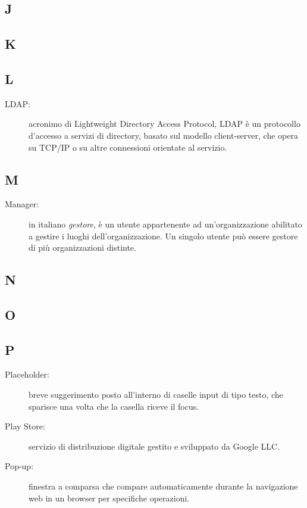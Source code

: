 \documentclass[../manuale-utente.tex]{subfiles}
\begin{document}
\subsection{J}

\subsection{K}

\subsection{L}
\begin{description}
  \item[LDAP:] acronimo di Lightweight Directory Access Protocol, LDAP è un protocollo d'accesso a servizi di directory, basato sul modello client-server, che opera su TCP/IP o su altre connessioni orientate al servizio.
\end{description}

\subsection{M}
\begin{description}
    \item[Manager:] in italiano \textit{gestore}, è un utente appartenente ad un'organizzazione abilitato a gestire i luoghi dell'organizzazione. Un singolo utente può essere gestore di più organizzazioni distinte.
\end{description}

\subsection{N}

\subsection{O}

\subsection{P}
\begin{description}
    \item[Placeholder:] breve suggerimento posto all'interno di caselle input di tipo testo, che sparisce una volta che la casella riceve il focus.
    \item[Play Store:] servizio di distribuzione digitale gestito e sviluppato da Google LLC\@.
    \item[Pop-up:] finestra a comparsa che compare automaticamente durante la navigazione web in un browser per specifiche operazioni.
\end{description}
\end{document}
